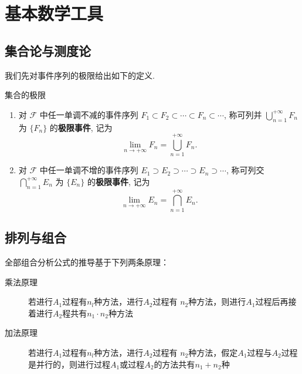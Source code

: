 \chapter{基本数学工具}

\section{集合论与测度论}

我们先对事件序列的极限给出如下的定义.

\begin{definition}{集合的极限}\label{def:limitation_of_set}
  \begin{enumerate}
    \item 对 $\mathscr{F}$ 中任一单调不减的事件序列 $F_1 \subset F_2 \subset \dotsb \subset F_n \subset \dotsb$,
    称可列并 $\bigcup_{n=1}^{+\infty} F_n$ 为 $\{ F_n \}$ 的\textbf{极限事件},
    记为
    \begin{equation}
      \lim_{n \to +\infty} F_n = \bigcup_{n=1}^{+\infty} F_n.
      \label{eq1.3.9}
    \end{equation}

    \item 对 $\mathscr{F}$ 中任一单调不增的事件序列 $E_1 \supset E_2 \supset \dotsb \supset E_n \supset \dotsb$,
    称可列交 $\bigcap_{n=1}^{+\infty} E_n$ 为 $\{ E_n \}$ 的\textbf{极限事件},
    记为
    \begin{equation}
      \lim _{n \to +\infty} E _n = \bigcap _{n=1} ^{+\infty} E_n.
      \label{eq1.3.10}
    \end{equation}
  \end{enumerate}
\end{definition}

\section{排列与组合}

全部组合分析公式的推导基于下列两条原理：
\begin{description}
  \item[乘法原理] 若进行$A_1$过程有$n_l$种方法，进行$A_2$过程有 $n_2$种方法，则进行$A_1$过程后再接着进行$A_2$程共有$n_1 \cdot  n_2$种方法
  \item[加法原理] 若进行$A_1$过程有$n_l$种方法，进行$A_2$过程有 $n_2$种方法，假定$A_1$过程与$A_2$过程是并行的，则进行过程$A_1$或过程$A_2$的方法共有$n_1 +n_2$种
\end{description}

